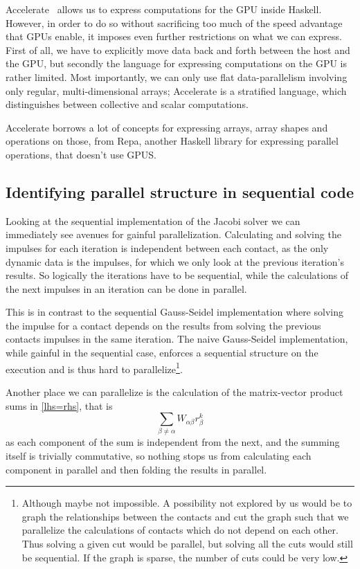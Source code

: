 \documentclass[runningheads,a4paper]{llncs}
\begin{document}
Accelerate~\cite{acc} allows us to express computations for the GPU inside
Haskell. However, in order to do so without sacrificing too much of the speed
advantage that GPUs enable, it imposes even further restrictions on what we can
express. First of all, we have to explicitly move data back and forth between
the host and the GPU, but secondly the language for expressing computations on
the GPU is rather limited. Most importantly, we can only use flat
data-parallelism involving only regular, multi-dimensional arrays; Accelerate
is a stratified language, which distinguishes between collective and scalar
computations.

Accelerate borrows a lot of concepts for expressing arrays, array shapes and
operations on those, from Repa\cite{repa}, another Haskell library for expressing parallel
operations, that doesn't use GPUS.

\subsection{Identifying parallel structure in sequential code}
Looking at the sequential implementation
of the Jacobi solver
we can immediately see avenues for gainful parallelization.
Calculating and solving the impulses
for each iteration is independent between each contact,
as the only dynamic data is the impulses,
for which we only look at the previous iteration's results.
So logically the iterations have to be sequential,
while the calculations of the next impulses in an iteration
can be done in parallel.

This is in contrast to the sequential Gauss-Seidel implementation
where solving the impulse for a contact depends
on the results from solving the previous contacts impulses
in the same iteration.
The naive Gauss-Seidel implementation,
while gainful in the sequential case,
enforces a sequential structure on the execution
and is thus hard to parallelize\footnote{
  Although maybe not impossible. A possibility not explored by us
  would be to graph the relationships between the contacts
  and cut the graph such that we parallelize the calculations
  of contacts which do not depend on each other.
  Thus solving a given cut would be parallel,
  but solving all the cuts would still be sequential.
  If the graph is sparse, the number of cuts could be very low.}.

Another place we can parallelize is the calculation
of the matrix-vector product sums in \eqref{lhs=rhs},
that is \[\sum\limits_{\beta \neq \alpha} W_{\alpha\beta} r_\beta^k\]
as each component of the sum is independent from the next,
and the summing itself is trivially commutative,
so nothing stops us from calculating each component in parallel
and then folding the results in parallel.
\end{document}

